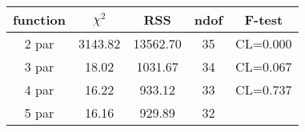 \begin{tabular}{c|c|c|c|c}
function & $\chi^2$ & RSS & ndof & F-test \\
\hline
2 par & 3143.82 & 13562.70 & 35 & CL=0.000 \\
3 par & 18.02 & 1031.67 & 34 & CL=0.067 \\
4 par & 16.22 & 933.12 & 33 & CL=0.737 \\
5 par & 16.16 & 929.89 & 32 & \\
\hline
\end{tabular}